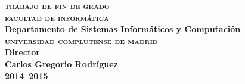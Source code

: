 \begin{titlepage}
\begin{center}
\begin{figure}[H]
  \end{figure}
  \vspace{0.5cm}
  \textbf{\textsc{\Large trabajo de fin de grado}}\\[0.5cm]
  \textbf{\textsc{\Large facultad de informática}}\\[0.25cm]
  \textbf{\large Departamento de Sistemas Informáticos y Computación}\\[0.5cm]
  \textbf{\textsc{\Large universidad complutense de madrid}}\\[0.5cm]
  \textbf{Director}\\[0.25cm]
  \textbf{\Large Carlos Gregorio Rodríguez}\\
  \vfill \textbf{\large 2014--2015}
\end{center}
\end{titlepage}
